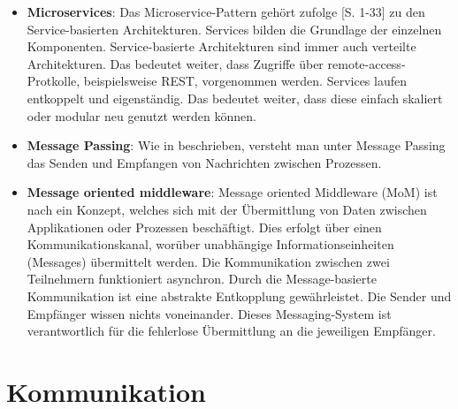 
\begin{itemize}
    \item \textbf{Microservices}: Das Microservice-Pattern gehört zufolge  \cite{microservices}[S. 1-33] zu den Service-basierten Architekturen. Services bilden die Grundlage der einzelnen Komponenten. Ser\-vice-bas\-ierte Architekturen sind immer auch verteilte Architekturen. Das bedeutet weiter, dass Zugriffe über remote-access-Protkolle, beispielsweise REST, vorgenommen werden. Services laufen entkoppelt und eigenständig. Das bedeutet weiter, dass diese einfach skaliert oder modular neu genutzt werden können.
    \item \textbf{Message Passing}: Wie in \cite[S.~5]{message-passing} beschrieben, versteht man unter Message Passing das Senden und Empfangen von Nachrichten zwischen Prozessen.
    \item \textbf{Message oriented middleware}: Message oriented Middleware (MoM) ist nach \cite[S.~77-100]{mim} ein Konzept, welches sich mit der Übermittlung von Daten zwischen Applikationen oder Prozessen beschäftigt. Dies erfolgt über einen Kommunikationskanal, worüber unabhängige In\-for\-ma\-tions\-ein\-hei\-ten (Messages) üb\-er\-mit\-telt werden. Die Kommunikation zwischen zwei Teilnehmern funktioniert asynchron. Durch die Mes\-sage-\-ba\-sier\-te Kommunikation ist eine abstrakte Entkopplung gewährleistet. Die Sender und Empfänger wissen nichts voneinander. Dieses Mess\-aging-System ist verantwortlich für die fehlerlose Üb\-er\-mit\-tlung an die jeweiligen Empfänger.
    
\end{itemize}



\section{Kommunikation}\label{literatur-kommunikation}

